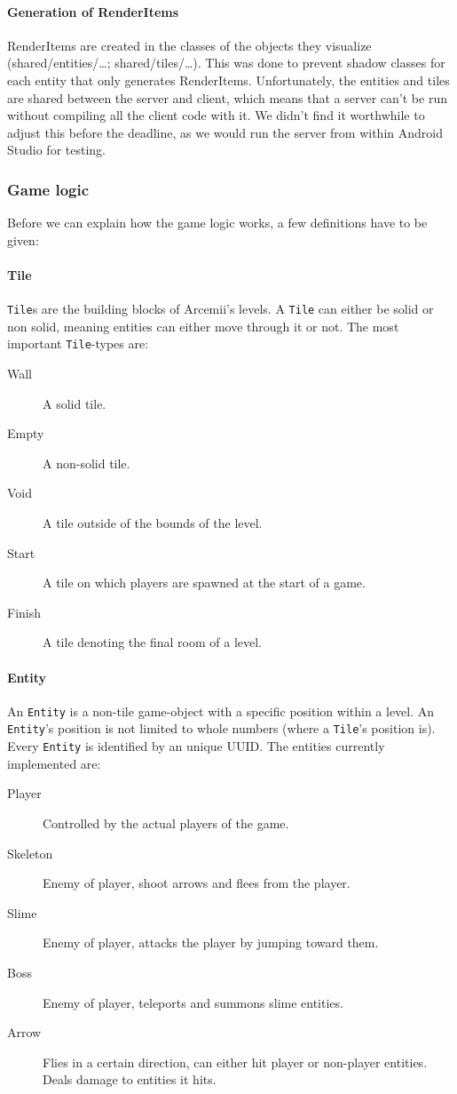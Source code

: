 \documentclass[../main.tex]{subfiles}
\begin{document}
		\paragraph{Generation of RenderItems} RenderItems are created in the classes of the objects they visualize (\tiny shared/entities/\dots; shared/tiles/\dots\normalsize). This was done to prevent shadow classes for each entity that only generates RenderItems. Unfortunately, the entities and tiles are shared between the server and client, which means that a server can't be run without compiling all the client code with it. We didn't find it worthwhile to adjust this before the deadline, as we would run the server from within Android Studio for testing. 

		
		\subsubsection{Game logic}\label{sec: game logic}
		Before we can explain how the game logic works, a few definitions have to be given:

		\paragraph{Tile} \texttt{Tile}s are the building blocks of Arcemii's levels. A \texttt{Tile} can either be solid or non solid, meaning entities can either move through it or not. The most important \texttt{Tile}-types are:
		\begin{description}
			\item[Wall] A solid tile.
			\item[Empty] A non-solid tile.
			\item[Void] A tile outside of the bounds of the level.
			\item[Start] A tile on which players are spawned at the start of a game.
			\item[Finish] A tile denoting the final room of a level.
		\end{description}

		\paragraph{Entity} An \texttt{Entity} is a non-tile game-object with a specific position within a level. An \texttt{Entity}'s position is not limited to whole numbers (where a \texttt{Tile}'s position is). Every \texttt{Entity} is identified by an unique UUID. The entities currently implemented are:
		\begin{description}
			\item[Player] Controlled by the actual players of the game.
			\item[Skeleton] Enemy of player, shoot arrows and flees from the player.
			\item[Slime] Enemy of player, attacks the player by jumping toward them.
			\item[Boss] Enemy of player, teleports and summons slime entities.
			\item[Arrow] Flies in a certain direction, can either hit player or non-player entities. Deals damage to entities it hits.
		\end{description}
\end{document}
